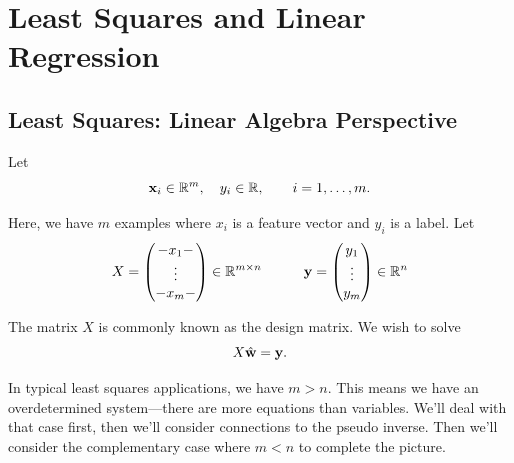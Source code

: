 \documentclass{book}
\newcommand{\x}{{ \bf x}}
\newcommand{\w}{{ \bf w}}
\newcommand{\y}{{\bf y}}
\newcommand{\R}{\mathbb{R}}
\begin{document}
\chapter{Least Squares and Linear Regression}
\section{Least Squares: Linear Algebra Perspective} 
Let
$$
\x_i \in \R^m,\quad y_i \in \R, \quad\quad i=1,\ldots, m.
$$

\vspace{1em}
Here, we have $m$ examples where $x_i$ is a feature vector and $y_i$ is a label. 
Let
$$
X = 
\begin{pmatrix}
    -x_1-\\
    \vdots\\
    -x_m-
\end{pmatrix}\in \R^{m\times n}
\quad \quad \quad
\y = 
\begin{pmatrix}
    y_1\\
    \vdots\\
    y_m
\end{pmatrix} \in \R^{n}
$$

The matrix $X$ is commonly known as the design matrix. We wish to solve 
\begin{equation} \label{eq:least-squares}
X\hat \w = \y. 
\end{equation}

In typical least squares applications, we have $m > n$. This means we have an overdetermined system---there are more equations than variables. We'll deal with that case first, then we'll consider connections to the pseudo inverse. Then we'll consider the complementary case where $m<n$ to complete the picture. 
\end{document}
